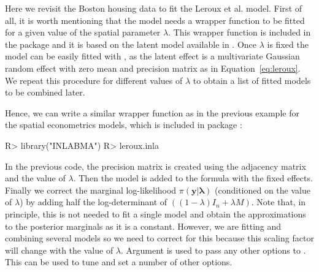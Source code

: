 \documentclass[article]{jss}
\begin{document}
Here we revisit the Boston housing data to fit the Leroux et al. model.  First
of all, it is worth mentioning that the model needs a wrapper function to be
fitted for a given value of the spatial parameter $\lambda$. This wrapper
function is included in the  package  and it is based
on the  latent model available in  .  Once $\lambda$
is fixed the model can be easily fitted with , as the latent effect
is a multivariate Gaussian random effect with zero mean and precision matrix as
in Equation~\ref{eq:leroux}.  We repeat this procedure for different values of
$\lambda$ to obtain a list of fitted models to be combined later.

Hence, we can write a similar wrapper function as in the previous example for
the spatial econometrics models, which is included in package :

\begin{Schunk}
\begin{Sinput}
R> library("INLABMA")
R> leroux.inla
\end{Sinput}
\end{Schunk}


In the previous code, the precision matrix  is created using the adjacency
matrix and the value of $\lambda$. Then the  model is added to the
formula with the fixed effects. Finally we correct the marginal log-likelihood
$\pi(\mathbf{y|\lambda})$ (conditioned on the value of $\lambda$) by adding half the log-determinant of $((1-\lambda)I_n+\lambda M)$.
Note that, in principle, this is not needed to fit a single model and obtain
the approximations to the posterior marginals as it is a constant. However, we
are fitting and combining several models so we need to correct for this
because this scaling factor will change with the value of $\lambda$.
Argument  is used to pass any other options to . 
This can be used to tune and set a number of other options.
\end{document}
